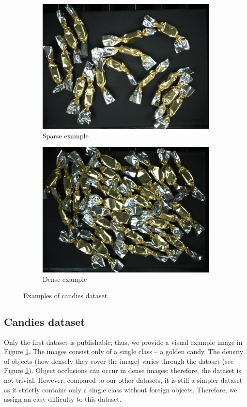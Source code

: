 \begin{figure}[H]

	\begin{subfigure}[c]{0.5\textwidth}
		\centering
		\includegraphics[width=0.9\linewidth]{Sources/Figures/sparse.jpg}
		\caption{Sparse example}

	\end{subfigure}
	\begin{subfigure}[c]{0.5\textwidth}
		\centering
		\includegraphics[width=0.9\linewidth]{Sources/Figures/dense.png}
		\caption{Dense example}

	\end{subfigure}

	\caption{Examples of candies dataset.}
	\label{fig:candies}
\end{figure}

\subsection*{Candies dataset}
Only the first dataset is publishable; thus, we provide a
visual example image in Figure \ref{fig:candies}. The images consist only of a
single class -- a golden candy. The density of objects (how densely they cover
the image) varies through the dataset (see Figure \ref{fig:candies}). Object
occlusions can occur in dense images; therefore, the dataset is not trivial.
However, compared to our other datasets, it is still a simpler dataset as it
strictly contains only a single class without foreign objects. Therefore, we
assign an easy difficulty to this dataset.


